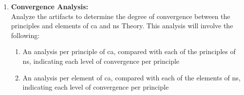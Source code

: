 \begin{enumerate}
\begin{enumerate}[label*={\arabic*.}]
    \end{enumerate}
    
    \item \textbf{Convergence Analysis:} \\
    Analyze the artifacts to determine the degree of convergence between the principles
    and elements of \gls{ca} and \gls{ns} Theory. This analysis will involve the following:
    \begin{enumerate}[label*={\arabic*.}]
        
        \item An analysis per principle of \gls{ca}, compared with each of the principles
        of \gls{ns}, indicating each level of convergence per principle
        
        \item An analysis per element of \gls{ca}, compared with each of the elements of
        \gls{ns}, indicating each level of convergence per principle
    
    \end{enumerate}
\end{enumerate}